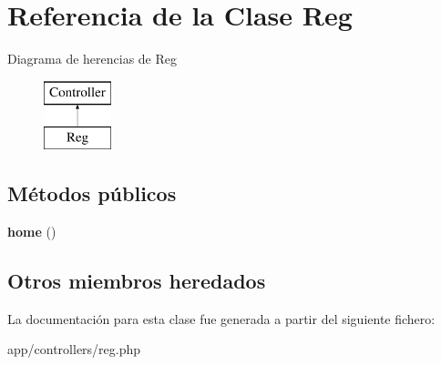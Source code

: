 \hypertarget{class_reg}{}\section{Referencia de la Clase Reg}
\label{class_reg}
Diagrama de herencias de Reg\begin{figure}[H]
\begin{center}
\leavevmode
\includegraphics[height=2.000000cm]{class_reg}
\end{center}
\end{figure}
\subsection*{Métodos públicos}
\begin{DoxyCompactItemize}
\item 
\hypertarget{class_reg_a174b8e4c7d4d7363c6f773671defdeff}{}{\bfseries home} ()\label{class_reg_a174b8e4c7d4d7363c6f773671defdeff}

\end{DoxyCompactItemize}
\subsection*{Otros miembros heredados}


La documentación para esta clase fue generada a partir del siguiente fichero\+:\begin{DoxyCompactItemize}
\item 
app/controllers/reg.\+php\end{DoxyCompactItemize}
